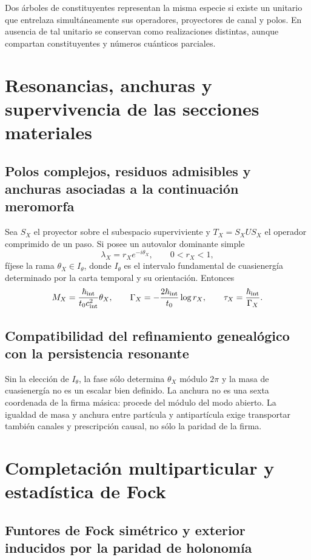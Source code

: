 Dos árboles de constituyentes representan la misma especie si existe un
unitario que entrelaza simultáneamente sus operadores, proyectores de canal y
polos. En ausencia de tal unitario se conservan como realizaciones distintas,
aunque compartan constituyentes y números cuánticos parciales.

\section{Resonancias, anchuras y supervivencia de las secciones materiales}

\subsection{Polos complejos, residuos admisibles y anchuras asociadas a la continuación meromorfa}

Sea \(S_X\) el proyector sobre el subespacio superviviente y
\(T_X=S_X U S_X\) el operador comprimido de un paso. Si posee un autovalor
dominante simple
\[
 \lambda_X=r_X e^{-i\theta_X},\qquad 0<r_X<1,
\]
fíjese la rama \(\theta_X\in I_\theta\), donde \(I_\theta\) es el intervalo
fundamental de cuasienergía determinado por la carta temporal y su orientación.
Entonces
\[
 M_X=\frac{\hbar_{\rm int}}{t_0c_{\rm int}^2}\theta_X,
 \qquad
 \Gamma_X=-\frac{2\hbar_{\rm int}}{t_0}\log r_X,
 \qquad
 \tau_X=\frac{\hbar_{\rm int}}{\Gamma_X}.
\]
\subsection{Compatibilidad del refinamiento genealógico con la persistencia resonante}

Sin la elección de \(I_\theta\), la fase sólo determina \(\theta_X\) módulo
\(2\pi\) y la masa de cuasienergía no es un escalar bien definido.
La anchura no es una sexta coordenada de la firma másica: procede del módulo
del modo abierto. La igualdad de masa y anchura entre partícula y
antipartícula exige transportar también canales y prescripción causal, no sólo
la paridad de la firma.

\section{Completación multiparticular y estadística de Fock}

\subsection{Funtores de Fock simétrico y exterior inducidos por la paridad de holonomía}

